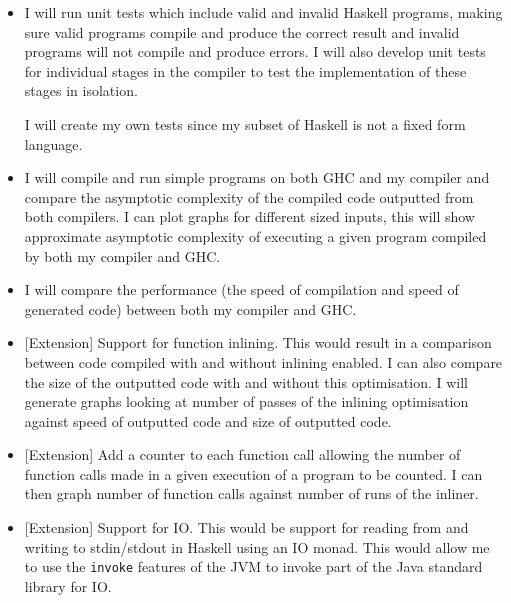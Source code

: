 \documentclass[12pt,a4paper,twoside]{article}
\begin{document}
  \begin{itemize}

    \item
      I will run unit tests which include valid and invalid Haskell programs, making sure valid programs compile and produce the correct result and invalid
      programs will not compile and produce errors. I will also develop unit tests for individual stages in the compiler to test the implementation of these stages
      in isolation.

      I will create my own tests since my subset of Haskell is not a fixed form language.

    \item

      I will compile and run simple programs on both GHC and my compiler and compare the asymptotic complexity of the
      compiled code outputted from both compilers. I can plot graphs for different sized inputs,
      this will show approximate asymptotic complexity of executing a given program compiled by both my compiler and GHC.

    \item

      I will compare the performance (the speed of compilation and speed of generated code) between both my compiler and GHC.

    \item

      [Extension] Support for function inlining. This would result in a comparison between code compiled with and without inlining enabled. I can also
      compare the size of the outputted code with and without this optimisation. I will generate graphs looking at number of passes of the inlining
      optimisation against speed of outputted code and size of outputted code.

    \item

      [Extension] Add a counter to each function call allowing the number of function calls made in a given execution of a
      program to be counted. I can then graph number of function calls against number of runs of the inliner.

    \item

      [Extension] Support for IO. This would be support for reading from and writing to stdin/stdout in Haskell using an IO monad.
      This would allow me to use the \texttt{invoke} features of the JVM to invoke part of the Java standard library for IO.


\end{itemize}
\end{document}
